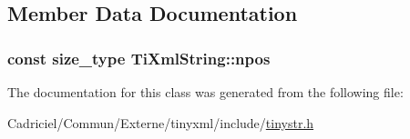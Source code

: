 \subsection{Member Data Documentation}
\hypertarget{class_ti_xml_string_a1aa6260982d3a63f0c822fe40fd7b37f}{
\subsubsection[{npos}]{\setlength{\rightskip}{0pt plus 5cm}const {\bf size\-\_\-type} Ti\-Xml\-String\-::npos\hspace{0.3cm}{\ttfamily [static]}}}\label{class_ti_xml_string_a1aa6260982d3a63f0c822fe40fd7b37f}


The documentation for this class was generated from the following file\-:\begin{DoxyCompactItemize}
\item 
Cadriciel/\-Commun/\-Externe/tinyxml/include/\hyperlink{tinystr_8h}{tinystr.\-h}\end{DoxyCompactItemize}
